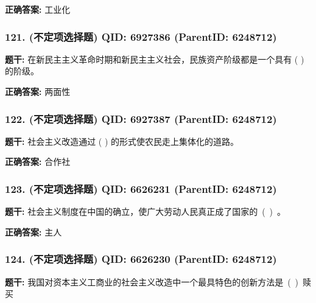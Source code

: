 \documentclass[12pt,UTF8]{ctexart}
\begin{document}
\textbf{正确答案:}
工业化

\vspace{0.3em}\hrulefill\vspace{0.7em}

\subsubsection*{121. (不定项选择题) \small QID: 6927386 (ParentID: 6248712)}

\textbf{题干:}
在新民主主义革命时期和新民主主义社会，民族资产阶级都是一个具有 ( ) 的阶级。



\textbf{正确答案:}
两面性

\vspace{0.3em}\hrulefill\vspace{0.7em}

\subsubsection*{122. (不定项选择题) \small QID: 6927387 (ParentID: 6248712)}

\textbf{题干:}
社会主义改造通过 ( ) 的形式使农民走上集体化的道路。



\textbf{正确答案:}
合作社

\vspace{0.3em}\hrulefill\vspace{0.7em}

\subsubsection*{123. (不定项选择题) \small QID: 6626231 (ParentID: 6248712)}

\textbf{题干:}
社会主义制度在中国的确立，使广大劳动人民真正成了国家的 ( ) 。



\textbf{正确答案:}
主人

\vspace{0.3em}\hrulefill\vspace{0.7em}

\subsubsection*{124. (不定项选择题) \small QID: 6626230 (ParentID: 6248712)}

\textbf{题干:}
我国对资本主义工商业的社会主义改造中一个最具特色的创新方法是 ( ) 赎买
\end{document}
